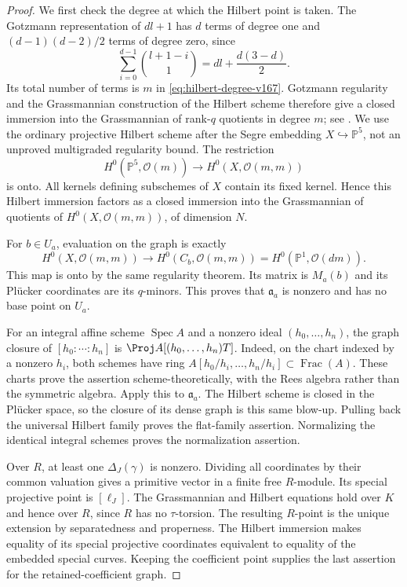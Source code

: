 \documentclass[11pt,reqno]{amsart}
\numberwithin{equation}{section}
\theoremstyle{definition}\newtheorem{definition}[theorem]{Definition}
\theoremstyle{remark}\newtheorem{remark}[theorem]{Remark}
\newcommand{\Pj}{\mathbb P}\newcommand{\A}{\mathbb A}
\newcommand{\OO}{\mathcal O}\newcommand{\II}{\mathcal I}
\DeclareMathOperator{\Spec}{Spec}\DeclareMathOperator{\PGL}{PGL}
\begin{document}
\begin{proof}
We first check the degree at which the Hilbert point is taken.
The Gotzmann representation of $dl+1$ has $d$ terms of degree one
and $(d-1)(d-2)/2$ terms of degree zero, since
\[
 \sum_{i=0}^{d-1}\binom{l+1-i}{1}
                       =dl+\frac{d(3-d)}2.
\]
Its total number of terms is $m$ in
\eqref{eq:hilbert-degree-v167}. Gotzmann regularity and the
Grassmannian construction of the Hilbert scheme therefore give a
closed immersion into the Grassmannian of rank-$q$ quotients in
degree $m$; see \cite{Gotzmann167,Grothendieck166}. We use the
ordinary projective Hilbert scheme after the Segre embedding
$X\hookrightarrow\Pj^5$, not an unproved multigraded regularity
bound. The restriction
\[
 H^0(\Pj^5,\OO(m))\longrightarrow H^0(X,\OO(m,m))
\]
is onto. All kernels defining subschemes of $X$ contain its fixed
kernel. Hence this Hilbert immersion factors as a closed immersion
into the Grassmannian of quotients of $H^0(X,\OO(m,m))$, of
dimension $N$.

For $b\in U_a$, evaluation on the graph is exactly
\[
 H^0(X,\OO(m,m))\longrightarrow
 H^0(C_b,\OO(m,m))=H^0(\Pj^1,\OO(dm)).
\]
This map is onto by the same regularity theorem. Its matrix is
$M_a(b)$ and its Pl\"ucker coordinates are its $q$-minors. This
proves that $\mathfrak a_a$ is nonzero and has no base point on
$U_a$.

For an integral affine scheme $\Spec A$ and a nonzero ideal
$(h_0,\ldots,h_n)$, the graph closure of $[h_0:\cdots:h_n]$ is
$\Proj A[(h_0,\ldots,h_n)T]$. Indeed, on the chart indexed by a
nonzero $h_i$, both schemes have ring
$A[h_0/h_i,\ldots,h_n/h_i]\subset\operatorname{Frac}(A)$.
These charts prove the assertion scheme-theoretically, with the
Rees algebra rather than the symmetric algebra. Apply this to
$\mathfrak a_a$. The Hilbert scheme is closed in the Pl\"ucker
space, so the closure of its dense graph is this same blow-up.
Pulling back the universal Hilbert family proves the flat-family
assertion. Normalizing the identical integral schemes proves the
normalization assertion.

Over $R$, at least one $\Delta_J(\gamma)$ is nonzero. Dividing
all coordinates by their common valuation gives a primitive
vector in a finite free $R$-module. Its special projective point
is $[\ell_J]$. The Grassmannian and Hilbert equations hold over
$K$ and hence over $R$, since $R$ has no $\tau$-torsion. The
resulting $R$-point is the unique extension by separatedness and
properness. The Hilbert immersion makes equality of its special
projective coordinates equivalent to equality of the embedded
special curves. Keeping the coefficient point supplies the last
assertion for the retained-coefficient graph.
\end{proof}
\end{document}

